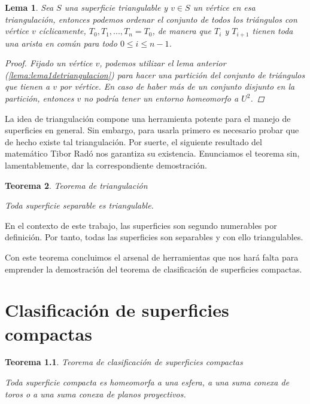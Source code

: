 \documentclass[a4paper,11pt,spanish, twoside, leqno]{tfg-uam}
\newtheorem{teor}{Teorema}[chapter]
\newtheorem{lema}[teor]{Lema}
\theoremstyle{definition}
\begin{document}
\begin{lema}\label{lema:lema2detriangulacion}
Sea  $S$ una superficie triangulable y $v\in S$ un vértice en esa triangulación, entonces podemos ordenar el conjunto de todos los triángulos con vértice $v$ cíclicamente,  $T_0, T_1, ..., T_n = T_0$, de manera que $T_i$ y $T_{i+1}$ tienen toda una arista en común para todo $0\leq i\leq n-1$.

\begin{proof}
Fijado un vértice $v$, podemos utilizar el lema anterior (\ref{lema:lema1detriangulacion}) para hacer una partición del conjunto de triángulos que tienen a $v$ por vértice. En caso de haber más de un conjunto disjunto en la partición, entonces $v$ no podría tener un entorno homeomorfo a $U^2$.
\end{proof}

\end{lema}

La idea de triangulación compone una herramienta potente para el manejo de superficies en general. Sin embargo, para usarla primero es necesario probar que de hecho existe  tal triangulación. Por suerte, el siguiente resultado del matemático Tibor Radó nos garantiza su existencia. Enunciamos el teorema sin, lamentablemente, dar la correspondiente demostración.

\begin{teor}{Teorema de triangulación}\label{teor:teoremaDeTriangulacion}	

Toda superficie separable es triangulable.
\end{teor}
En el contexto de este trabajo, las superficies son segundo numerables por definición. Por tanto, todas las superficies son separables y con ello triangulables.

Con este teorema concluimos el arsenal de herramientas que nos hará falta para emprender la demostración del teorema de clasificación de superficies compactas.





\chapter{Clasificación de superficies compactas}
\label{chap:clasifcompacta}
\begin{teor}{Teorema de clasificación de superficies compactas}\label{teor:teoremadeclasificacion}	

Toda superficie compacta es homeomorfa a una esfera, a una suma conexa de toros o a una suma conexa de planos proyectivos.
\end{teor}
\end{document}
